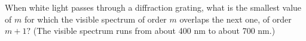 When white light passes through a diffraction grating,
what is the smallest value of $m$ for which the visible
spectrum of order $m$ overlaps the next one, of order $m+1?$
(The visible spectrum runs from about 400 nm to about 700 nm.)

